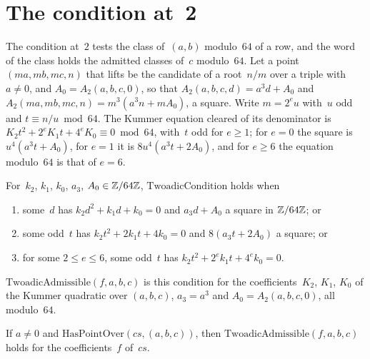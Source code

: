 \section{The condition at~2}\label{sec:sieveTwoAdic}

The condition at~$2$ tests the class of~$(a, b)$ modulo~$64$ of a row, and the word of the class
holds the admitted classes of~$c$ modulo~$64$. Let a point $(m a, m b, m c, n)$ that lifts be the
candidate of a root~$n/m$ over a triple with $a \ne 0$, and $A_0 = A_2(a, b, c, 0)$, so that
$A_2(a, b, c, d) = a^3 d + A_0$ and $A_2(m a, m b, m c, n) = m^3 (a^3 n + m A_0)$, a square. Write
$m = 2^e u$ with~$u$ odd and $t \equiv n / u \bmod 64$. The Kummer equation cleared of its
denominator is $K_2 t^2 + 2^e K_1 t + 4^e K_0 \equiv 0 \bmod 64$, with~$t$ odd for $e \ge 1$; for
$e = 0$ the square is $u^4 (a^3 t + A_0)$, for $e = 1$ it is $8 u^4 (a^3 t + 2 A_0)$, and for
$e \ge 6$ the equation modulo~$64$ is that of $e = 6$.

\begin{definition}\label{def:TwoadicCondition}
  \leanok
  For~$k_2$, $k_1$, $k_0$, $a_3$, $A_0 \in \mathbb{Z}/64\mathbb{Z}$, $\mathrm{TwoadicCondition}$ holds when
  \begin{enumerate}
    \item some~$d$ has $k_2 d^2 + k_1 d + k_0 = 0$ and $a_3 d + A_0$ a square in $\mathbb{Z}/64\mathbb{Z}$; or
    \item some odd~$t$ has $k_2 t^2 + 2 k_1 t + 4 k_0 = 0$ and $8 (a_3 t + 2 A_0)$ a square; or
    \item for some $2 \le e \le 6$, some odd~$t$ has $k_2 t^2 + 2^e k_1 t + 4^e k_0 = 0$.
  \end{enumerate}
  $\mathrm{TwoadicAdmissible}(f, a, b, c)$ is this condition for the coefficients~$K_2$, $K_1$,
  $K_0$ of the Kummer quadratic over $(a, b, c)$, $a_3 = a^3$ and $A_0 = A_2(a, b, c, 0)$, all
  modulo~$64$.
\end{definition}

\begin{lemma}\label{lem:twoadicAdmissible_of_hasPointOver}
  \leanok
  If $a \ne 0$ and $\mathrm{HasPointOver}(\mathit{cs}, (a, b, c))$, then
  $\mathrm{TwoadicAdmissible}(f, a, b, c)$ holds for the coefficients~$f$ of~$\mathit{cs}$.
\end{lemma}

